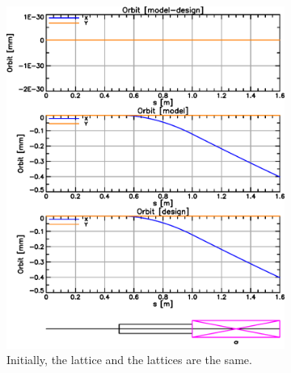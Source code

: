 \documentclass{hitec}     %
\begin{document}
\begin{figure}[tb]
  \centering
  \begin{subfigure}[t]{0.48\textwidth}
    \includegraphics[width=\textwidth]{model-equal-design.pdf}
    \caption{Initially, the  lattice and the  lattices are the same.}
    \label{f:model.eq.design}
  \end{subfigure}
  \hfil
  \begin{subfigure}[t]{0.48\textwidth}

\end{subfigure}
\end{figure}
\end{document}
